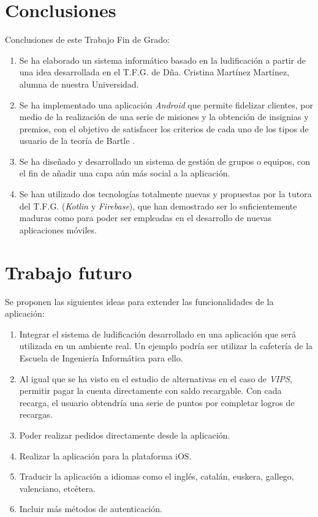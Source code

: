\documentclass[twoside]{report}
\begin{document}
\section{Conclusiones}

Conclusiones de este Trabajo Fin de Grado:
\begin{enumerate}

\item Se ha elaborado un sistema informático basado en la ludificación a partir de una idea desarrollada en el T.F.G. de Dña. Cristina Martínez Martínez, alumna de nuestra Universidad.

\item Se ha implementado una aplicación \textit{Android} que permite fidelizar clientes, por medio de la realización de una serie de misiones y la obtención de insignias y premios, con el objetivo de satisfacer los criterios de cada uno de los tipos de usuario de la teoría de Bartle \cite{iebsctj}.

\item Se ha diseñado y desarrollado un sistema de gestión de grupos o equipos, con el fin de añadir una capa aún más social a la aplicación.

\item Se han utilizado dos tecnologías totalmente nuevas y propuestas por la tutora del T.F.G. (\textit{Kotlin} y \textit{Firebase}), que han demostrado ser lo suficientemente maduras como para poder ser empleadas en el desarrollo de nuevas aplicaciones móviles.
\end{enumerate}

\section{Trabajo futuro}

Se proponen las siguientes ideas para extender las funcionalidades de la aplicación:

\begin{enumerate}
\item Integrar el sistema de ludificación desarrollado en una aplicación que será utilizada en un ambiente real. Un ejemplo podría ser utilizar la cafetería de la Escuela de Ingeniería Informática para ello.

\item Al igual que se ha visto en el estudio de alternativas en el caso de \textit{VIPS}, permitir pagar la cuenta directamente con saldo recargable. Con cada recarga, el usuario obtendría una serie de puntos por completar logros de recargas.

\item Poder realizar pedidos directamente desde la aplicación.

\item Realizar la aplicación para la plataforma iOS.

\item Traducir la aplicación a idiomas como el inglés, catalán, euskera, gallego, valenciano, etcétera.

\item Incluir más métodos de autenticación.
\end{enumerate}
\end{document}
